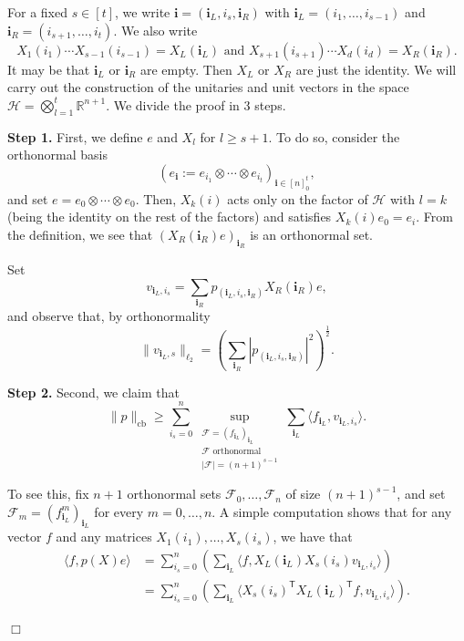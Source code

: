 \documentclass[11pt]{article}
\DeclareMathOperator{\cb}{cb}
\newcommand{\norm}[1]{\|#1\|}
\newcommand{\R}{\mathbb{R}} %
\newcommand{\1}{\mathbf{1}}
\newcommand{\ind}[1]{\mathbf{#1}}
\theoremstyle{plain}
\theoremstyle{definition}
\theoremstyle{remark}
\renewenvironment{proof}[1][]{
    	\begin{trivlist}
     	\item[\hspace{\labelsep}{\em\noindent Proof#1:\/}]}
     	{{\hfill$\Box$}
    	\end{trivlist}
  }
\begin{document}
\begin{proof}
For a fixed $s\in [t]$, we write $\ind i=({\ind{i}_L},i_s,{\ind{i}_R})$ with ${\ind{i}_L}=(i_1,\dots, i_{s-1})$ and ${\ind{i}_R}=(i_{s+1},\dots, i_t)$.  We also write 
$$X_1(i_1)\cdots X_{s-1}(i_{s-1})=X_{L}({\ind{i}_L}) \mbox{ and }X_{s+1}(i_{s+1})\cdots X_d(i_{d})=X_R({\ind{i}_R}).$$
It may be that ${\ind{i}_L}$ or ${\ind{i}_R}$ are empty. Then $X_L$ or $X_R$ are just the identity. We will carry out the construction of the unitaries and unit vectors in the space $\mathcal{H}=\bigotimes _{l=1}^t\R^{n+1}.$ We divide the proof in 3 steps.

{\bf Step 1.} First, we define $e$ and $X_l$ for $l\geq s+1.$ 
To do so, consider the  orthonormal basis $$(e_{\ind i}:=e_{i_{1}} \otimes \cdots \otimes e_{i_{t}})_{\ind i\in[n]_0^t},$$ and set $e=e_0\otimes \cdots\otimes e_0$. Then, $X_{k}(i)$ acts only on the factor of $\mathcal{H}$ with $l=k$ (being the identity on the rest of the factors) and satisfies $X_k(i)e_0=e_{i}$.   
From the definition, we see that $(X_{R}({\ind{i}_R})e)_{{{\ind{i}_R}}}$ is an orthonormal set. 
    

 Set $$v_{{\ind{i}_L},i_s}=\sum_{{\ind{i}_R}} p_{({\ind{i}_L},i_s,{\ind{i}_R})} X_R({\ind{i}_R}) e,$$ and observe that, by orthonormality 
\begin{equation}
\label{eq:orthonormalityv}\norm{v_{{\ind{i}_L},s}}_{\ell_2}= \left(\sum_{{\ind{i}_R}}  |p_{({\ind{i}_L},i_s,{\ind{i}_R})}|^2\right)^\frac12.\end{equation}

  {\bf Step 2.} Second, we claim that
\begin{equation}
\label{eq:step1}\norm{p}_{\cb}\geq \sum_{i_s=0}^n \sup _{\substack{\mathcal{F}=(f_{{\ind{i}_L}})_{{\ind{i}_L}}\\
\mathcal{F}\text{ orthonormal}\\|\mathcal{F}|=(n+1)^{s-1}}} \sum_{{\ind{i}_L}} \langle f_{{\ind{i}_L}}, v_{{\ind{i}_L},i_s}\rangle.\end{equation}


To see this, fix $n+1$ orthonormal sets $\mathcal{F}_0, \dots, \mathcal{F}_{n}$ of size $(n+1)^{s-1}$, and set $\mathcal{F}_m=(f^m_{{\ind{i}_L}})_{{\ind{i}_L}}$ for every $m=0,\ldots, n$. A simple computation shows that for any vector $f$ and any matrices  $X_1(i_1),\dots, X_s(i_s)$, we have that 
    \begin{align*}
        \langle f, p(X) e\rangle &=\sum_{i_s=0}^ n \left( \sum_{{\ind{i}_L}} \langle f, X_L({\ind{i}_L}) X_s(i_s) v_{{\ind{i}_L},i_s}\rangle\right) \\
         &=\sum_{i_s=0}^ n \left( \sum_{{\ind{i}_L}} \langle X_s(i_s) ^{\mathsf T} X_{L}({\ind{i}_L})^{\mathsf T} f,   v_{{\ind{i}_L},i_s}\rangle\right).
    \end{align*}



\end{proof}
\end{document}
